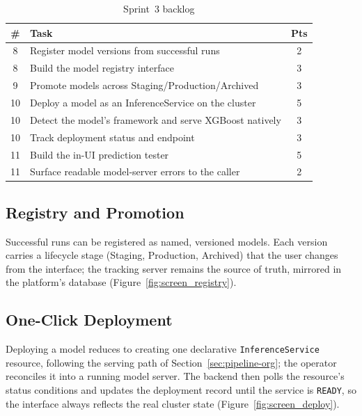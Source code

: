 \begin{table}[H]\centering
\renewcommand{\arraystretch}{1.15}
\caption{Sprint~3 backlog}\label{tab:backlog-s3}
\small
\begin{tabularx}{\textwidth}{|c|X|c|}
\hline
\rowcolor{primary!15}
\textbf{\#} & \textbf{Task} & \textbf{Pts}\\
\hline
8  & Register model versions from successful runs & 2\\ \hline
8  & Build the model registry interface & 3\\ \hline
9  & Promote models across Staging/Production/Archived & 3\\ \hline
10 & Deploy a model as an InferenceService on the cluster & 5\\ \hline
10 & Detect the model's framework and serve XGBoost natively & 3\\ \hline
10 & Track deployment status and endpoint & 3\\ \hline
11 & Build the in-UI prediction tester & 5\\ \hline
11 & Surface readable model-server errors to the caller & 2\\ \hline
\end{tabularx}
\end{table}

\subsection{Registry and Promotion}
Successful runs can be registered as named, versioned models. Each version
carries a lifecycle stage (Staging, Production, Archived) that the user
changes from the interface; the tracking server remains the source of truth,
mirrored in the platform's database (Figure~\ref{fig:screen_registry}).


\subsection{One-Click Deployment}
Deploying a model reduces to creating one declarative \texttt{InferenceService}
resource, following the serving path of Section~\ref{sec:pipeline-org}; the
operator reconciles it into a running model server. The backend then polls the
resource's status conditions and updates the deployment record until the
service is \texttt{READY}, so the interface always reflects the real cluster
state (Figure~\ref{fig:screen_deploy}).

